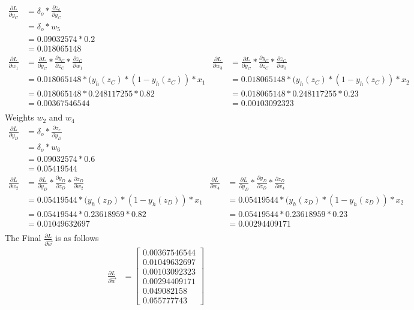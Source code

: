 \documentclass[12pt,english]{article}
\begin{document}
\begin{align*}
 \frac{\partial L}{\partial y_C}  &= \delta_o * \frac{\partial z_e}{\partial y_C}\\
&= \delta_o * w_5\\
&= 0.09032574 * 0.2\\
&=0.018065148\\
\frac{\partial L}{\partial w_1} &=\frac{\partial L}{\partial y_C} * \frac{\partial y_C}{\partial z_C} * \frac{\partial z_C}{\partial w_1} &
\frac{\partial L}{\partial w_3} &=\frac{\partial L}{\partial y_C} * \frac{\partial y_C}{\partial z_C} * \frac{\partial z_C}{\partial w_3} \\
&=0.018065148 * (y_h(z_C) *(1 -y_h(z_C)) * x_1 &
&=0.018065148 * (y_h(z_C) *(1 -y_h(z_C)) * x_2\\
&=0.018065148 * 0.248117255 * 0.82 &
&=0.018065148 * 0.248117255 * 0.23\\
&=0.00367546544 &
&=0.00103092323\\
\end{align*}
Weights $w_2$ and $w_4$
\begin{align*}
 \frac{\partial L}{\partial y_D}  &= \delta_o * \frac{\partial z_e}{\partial y_D}\\
&= \delta_o * w_6\\
&= 0.09032574 * 0.6\\
&= 0.05419544\\
\frac{\partial L}{\partial w_2} &=\frac{\partial L}{\partial y_D} * \frac{\partial y_D}{\partial z_D} * \frac{\partial z_D}{\partial w_2} &
\frac{\partial L}{\partial w_4} &=\frac{\partial L}{\partial y_D} * \frac{\partial y_D}{\partial z_D} * \frac{\partial z_D}{\partial w_4} \\
&=0.05419544 * (y_h(z_D) *(1 -y_h(z_D)) * x_1 &
&=0.05419544 * (y_h(z_D) *(1 -y_h(z_D)) * x_2\\
&=0.05419544 * 0.23618959 * 0.82 &
&=0.05419544 * 0.23618959 * 0.23\\
&=0.01049632697 &
&=0.00294409171\\
\end{align*}
The Final $\frac{\partial L}{\partial\vec{w}}$ is as follows
\begin{align*}
\frac{\partial L}{\partial\vec{w}} &= \begin{bmatrix} 0.00367546544 \\0.01049632697 \\0.00103092323\\0.00294409171\\0.049082158\\0.055777743\end{bmatrix}
\end{align*}
\end{document}
